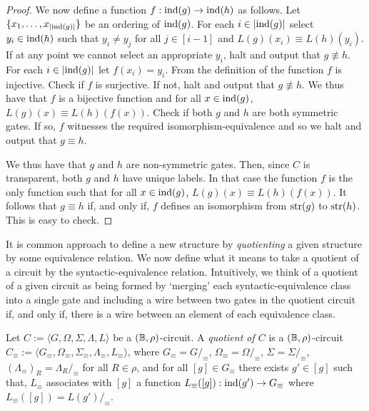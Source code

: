 \documentclass[../paper.tex]{subfiles}
\begin{document}
\begin{proof}
  We now define a function $f: \text{\upshape ind}(g) \rightarrow \text{\upshape ind}(h)$ as follows. Let
  $\{x_1, \ldots, x_{\vert \text{\upshape ind}(g)\vert}\}$ be an ordering of $\text{\upshape ind}(g)$. For
  each $i \in \vert \text{\upshape ind}(g) \vert$ select $y_i \in \text{\upshape ind}(h)$ such that $y_i \neq
  y_j$ for all $j \in [i-1]$ and $L(g)(x_i) \equiv L(h)(y_i)$. If at any point
  we cannot select an appropriate $y_i$, halt and output that $g \not\equiv h$.
  For each $i \in \vert \text{\upshape ind}(g) \vert$ let $f(x_i) = y_i$. From the definition
  of the function $f$ is injective. Check if $f$ is surjective. If not, halt and
  output that $g \not\equiv h$. We thus have that $f$ is a bijective function
  and for all $x \in \text{\upshape ind}(g)$, $L(g)(x) \equiv L(h)(f(x))$. Check if both $g$
  and $h$ are both symmetric gates. If so, $f$ witnesses the required
  isomorphism-equivalence and so we halt and output that $g \equiv h$.

  We thus have that $g$ and $h$ are non-symmetric gates. Then, since $C$ is
  transparent, both $g$ and $h$ have unique labels. In that case the function
  $f$ is the only function such that for all $x \in \text{\upshape ind}(g)$, $L(g)(x) \equiv
  L(h)(f(x))$. It follows that $g \equiv h$ if, and only if, $f$ defines an
  isomorphism from $\text{str}(g)$ to $\text{str}(h)$. This is easy to check.
\end{proof}

It is common approach to define a new structure by \emph{quotienting} a given
structure by some equivalence relation. We now define what it means to take a
quotient of a circuit by the syntactic-equivalence relation. Intuitively, we
think of a quotient of a given circuit as being formed by `merging' each
syntactic-equivalence class into a single gate and including a wire between two
gates in the quotient circuit if, and only if, there is a wire between an
element of each equivalence class.

\begin{definition}
  Let $C := \langle G, \Omega, \Sigma, \Lambda, L \rangle$ be a $(\mathbb{B},
  \rho)$-circuit. A \emph{quotient of $C$} is a $(\mathbb{B}, \rho)$-circuit $C_\equiv
  := \langle G_\equiv , \Omega_\equiv, \Sigma_\equiv , \Lambda_\equiv, L_\equiv
  \rangle$, where $G_\equiv = G /_\equiv$, $\Omega_\equiv = \Omega /_\equiv$,
  $\Sigma = \Sigma /_\equiv$, $(\Lambda_\equiv)_R = \Lambda_R /_\equiv$ for all
  $R \in \rho$, and for all $[g] \in G_\equiv$ there exists $g' \in [g]$ such
  that, $L_\equiv$ associates with $[g]$ a function $L_\equiv([g]) : \text{\upshape ind}(g')
  \rightarrow G_\equiv$ where $L_\equiv([g]) = L(g')/_\equiv$.
\end{definition}
\end{document}
